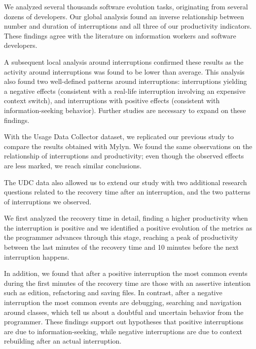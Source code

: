 \documentclass[times]{smrauth}
\begin{document}
We analyzed several thousands software evolution tasks, originating from several dozens of developers. Our global analysis found an inverse relationship between number and duration of interruptions and all three of our productivity indicators. These findings agree with the literature on information workers and software developers. 

A subsequent local analysis around interruptions confirmed these results as the activity around interruptions was found to be lower than average. This analysis also found two well-defined patterns around interruptions: interruptions yielding a negative effects (consistent with a real-life interruption involving an expensive context switch), and interruptions with positive effects (consistent with information-seeking behavior). Further studies are necessary to expand on these findings.

With the Usage Data Collector dataset, we replicated our previous study to compare the results obtained with Mylyn. We found the same observations on the relationship of interruptions and productivity; even though the observed effects are less marked, we reach similar conclusions.

The UDC data also allowed us to extend our study with two additional research questions related to the recovery time after an interruption, and the two patterns of interruptions we observed. 

We first analyzed the recovery time in detail, finding a higher productivity when the interruption is positive and we identified a positive evolution of the metrics as the programmer advances through this stage, reaching a peak of productivity between the last minutes of the recovery time and 10 minutes before the next interruption happens.  

In addition, we found that after a positive interruption the most common events during the first minutes of the recovery time are those with an assertive intention such as edition, refactoring and saving files. In contrast, after a negative interruption the most common events are debugging, searching and navigation around classes, which tell us about a doubtful and uncertain behavior from the programmer. These findings support out hypotheses that positive interruptions are due to information-seeking, while negative interruptions are due to context rebuilding after an actual interruption.





\end{document}
